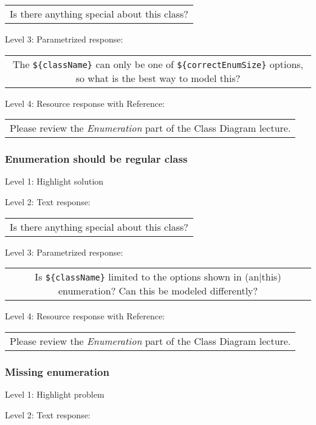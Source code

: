 \begin{tabular}{|c}
Is there anything special about this class?
\end{tabular} \medskip

\noindent Level 3: Parametrized response: \medskip

\begin{tabular}{|c}
The \verb|${className}| can only be one of \verb|${correctEnumSize}| options, so what is the best way to model this?
\end{tabular} \medskip

\noindent Level 4: Resource response with Reference:

\begin{tabular}{|c}
Please review the \textit{Enumeration} part of the Class Diagram lecture.
\end{tabular} \medskip


\subsubsection{Enumeration should be regular class}

\noindent Level 1: Highlight solution \medskip

\noindent Level 2: Text response: \medskip

\begin{tabular}{|c}
Is there anything special about this class?
\end{tabular} \medskip

\noindent Level 3: Parametrized response: \medskip

\begin{tabular}{|c}
Is \verb|${className}| limited to the options shown in (an|this) enumeration? Can this be modeled differently?
\end{tabular} \medskip

\noindent Level 4: Resource response with Reference:

\begin{tabular}{|c}
Please review the \textit{Enumeration} part of the Class Diagram lecture.
\end{tabular} \medskip


\subsubsection{Missing enumeration}

\noindent Level 1: Highlight problem \medskip

\noindent Level 2: Text response: \medskip

